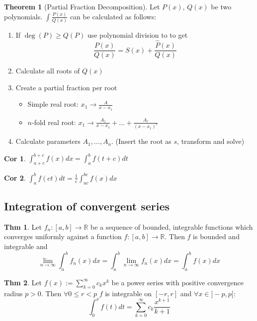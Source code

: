 \documentclass[a4paper, 10pt]{article}
\newtheorem*{corollary}{Cor}
\theoremstyle{definition}
\newtheorem*{theorem}{Thm}
\theoremstyle{named}
\newtheorem*{ntheorem_wrapper}{Theorem}
\newenvironment{ntheorem}%
    {\begin{mdframed}[style=important]\begin{ntheorem_wrapper}}%
    {\end{ntheorem_wrapper}\end{mdframed}}
\newcommand{\R}{\mathbb{R}}
\begin{document}
\begin{ntheorem}[Partial Fraction Decomposition]
    Let $P(x)$, $Q(x)$ be two polynomials. $\int \frac{P(x)}{Q(x)}$ can be calculated as follows:
    \begin{enumerate}
        \item If $\deg(P) \geq Q(P)$ use polynomial division to to get
        $$\frac{P(x)}{Q(x)} = S(x) + \frac{\hat{P}(x)}{Q(x)}$$
        \item Calculate all roots of $Q(x)$
        \item Create a partial fraction per root
        \begin{itemize}
            \item Simple real root: $x_1 \to \frac{A}{x - x_1}$
            \item $n$-fold real root: $x_1 \to \frac{A_1}{x - x_1} + \ldots + \frac{A_r}{(x - x_1)^r}$
        \end{itemize}
        \item Calculate parameters $A_1, \ldots, A_n$. (Insert the root as $s$, transform and solve)
    \end{enumerate}
\end{ntheorem}

\begin{corollary}
    $\int_{a + c}^{b + c} f(x) dx = \int_a^b f(t + c) dt$
\end{corollary}

\begin{corollary}
    $\int_a^b f(ct) dt = \frac{1}{c} \int_{ac}^{bc} f(x) dx$
\end{corollary}

\subsection{Integration of convergent series}
\begin{theorem}
    Let $f_n: [a, b] \to \R$ be a sequence of bounded, integrable functions which converges uniformly against a function $f: [a, b] \to \R$. Then $f$ is bounded and integrable and
    $$\lim_{n \to \infty} \int_a^b f_n(x) dx = \int_a^b \lim_{n \to \infty}  f_n(x) dx = \int_a^b f(x) dx$$
\end{theorem}

\begin{theorem}
    Let $f(x) := \sum_{k=0}^\infty c_k x^k$ be a power series with positive convergence radius $p > 0$. Then $\forall 0 \leq r < p$ $f$ is integrable on $[-r, r]$ and $\forall x \in ]-p, p[$:
    $$\int_0^x f(t) dt = \sum_{k=0}^\infty c_k \frac{x^{k + 1}}{k + 1}$$
\end{theorem}
\end{document}
